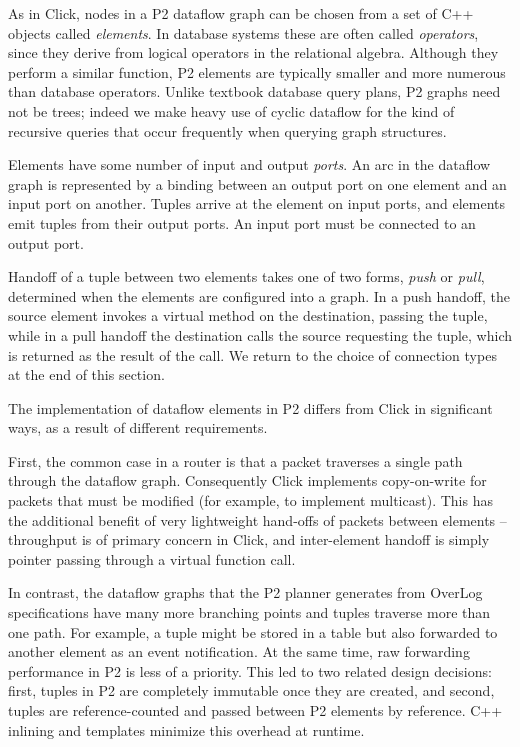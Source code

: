 \documentclass{sig-alt-full}
\def\Sys{P2\xspace}
\def\Lang{OverLog\xspace}
\newcommand{\note}[1]{}
\begin{document}
As in Click, nodes in a \Sys dataflow graph can be chosen from a set of C++
objects called \textit{elements}.  In database systems these are often
called \textit{operators}, since they derive from logical operators in
the relational algebra. Although they perform a similar
function, \Sys elements are typically smaller and more numerous than
database operators.  Unlike textbook
database query plans, \Sys graphs need not be trees; indeed we
make heavy use of cyclic dataflow for the kind of recursive  
queries that occur frequently when querying graph structures.  

Elements have some number of input and output \emph{ports}.  An arc in
the dataflow graph is represented by a binding between an output port
on one element and an input port on another.  Tuples arrive at the
element on input ports, and elements emit tuples from their output
ports. An input port must be connected to an output port.  

Handoff of a tuple between two elements takes one of two forms,
\emph{push} or \emph{pull}, determined when the elements are
configured into a graph.  In a push handoff, the source element
invokes a virtual method on the destination, passing the tuple, while
in a pull handoff the destination calls the source requesting the
tuple, which is returned as the result of the call.  We return to the
choice of connection types at the end of this section.

\note{Now, how are we different?:}

The implementation of dataflow elements in \Sys differs from Click in
significant ways, as a result of different requirements.

First, the common case in a router is that a
packet traverses a single path through the dataflow graph. 
Consequently Click implements copy-on-write for packets that must be
modified (for example, to implement multicast).  This has the additional
benefit of very lightweight hand-offs of packets between elements --
throughput is of primary concern in Click, and inter-element handoff is
simply pointer passing through a virtual function call. 

In contrast, the dataflow graphs that the \Sys planner generates from
\Lang specifications have many more branching points and tuples
traverse 
more than one path.  For example, a tuple might be stored in a table
but also forwarded to another element as an event notification.  At
the same time, raw forwarding performance in \Sys is less of a
priority.  This led to two related design decisions: first, tuples in
\Sys are completely immutable once they are created, and second,
tuples are reference-counted and passed between \Sys elements by
reference.  C++ inlining and templates minimize this overhead at
runtime.  
\end{document}
